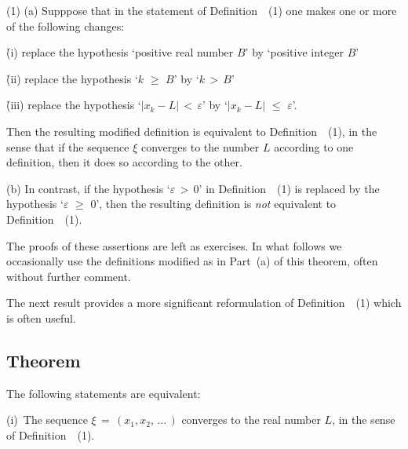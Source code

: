 \V

        (1) (a) Supppose that in the statement of Definition~~(1) one makes one or more of the following changes:

\VA

      \h  (i) replace the hypothesis `positive real number $B$' by `positive integer $B$'

\VA

      \h  (ii) replace the hypothesis `$k\,\,{\geq}\,\,B$' by `$k\,>\,B$'

\VA

     \h   (iii) replace the hypothesis `$|x_{k}-L|\,<\,{\varepsilon}$' by `$|x_{k}-L|\,\,{\leq}\,\,{\varepsilon}$'.

\VA

\noindent Then the resulting modified definition is equivalent to Definition~~(1), in the sense that if the sequence ${\xi}$ converges to the number $L$ according to one definition, 
    then it does so according to the other.

\V

        (b) In contrast, if the hypothesis `${\varepsilon}\,>\,0$' in Definition~~(1) is replaced by the hypothesis `${\varepsilon}\,\,{\geq}\,\,0$',
    then the resulting definition is {\em not} equivalent to Definition~~(1).

\V

        The proofs of these assertions are left as exercises. In what follows we occasionally use the definitions modified as in Part~(a) of this theorem, often without further comment.


\VV

        The next result provides a more significant reformulation of Definition~~(1) which is often useful.

\V

            \subsection{\small{\bf Theorem}}
            \label{ThmC10.15}

\V

        The following statements are equivalent:

\V

        (i)\, The sequence ${\xi} \,=\, (x_{1},x_{2},\,{\ldots}\,)$ converges to the real number $L$, in the sense of Definition~~(1).

